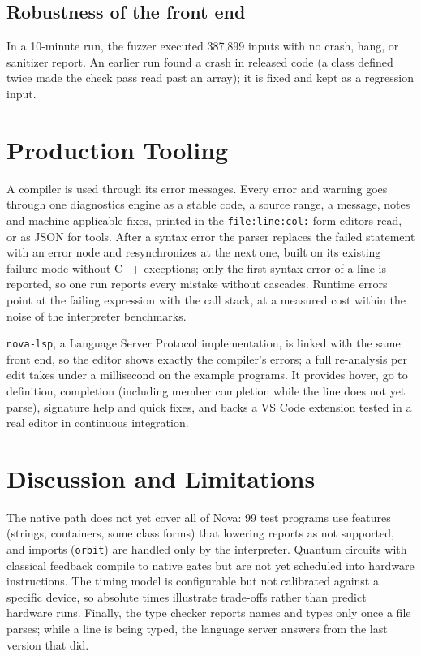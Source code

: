 \documentclass[11pt]{article}
\begin{document}
\subsection{Robustness of the front end}

In a 10-minute run, the fuzzer executed 387{,}899 inputs with no crash, hang, or sanitizer report. An earlier run
found a crash in released code (a class defined twice made the check pass read past an array); it is fixed and kept
as a regression input.

\section{Production Tooling}
\label{sec:tooling}

A compiler is used through its error messages. Every error and warning goes through one diagnostics engine as a
stable code, a source range, a message, notes and machine-applicable fixes, printed in the
\texttt{file:line:col:} form editors read, or as JSON for tools. After a syntax error the parser replaces the failed
statement with an error node and resynchronizes at the next one, built on its existing failure mode without C++
exceptions; only the first syntax error of a line is reported, so one run reports every mistake without cascades.
Runtime errors point at the failing expression with the call stack, at a measured cost within the noise of the
interpreter benchmarks.

\texttt{nova-lsp}, a Language Server Protocol implementation, is linked with the same front end, so the editor
shows exactly the compiler's errors; a full re-analysis per edit takes under a millisecond on the example programs.
It provides hover, go to definition, completion (including member completion while the line does not yet parse),
signature help and quick fixes, and backs a VS Code extension tested in a real editor in continuous integration.

\section{Discussion and Limitations}

The native path does not yet cover all of Nova: 99 test programs use features (strings, containers, some class
forms) that lowering reports as not supported, and imports (\texttt{orbit}) are handled only by the interpreter.
Quantum circuits with classical feedback compile to native gates but are not yet scheduled into hardware
instructions. The timing model is configurable but not calibrated against a specific device, so absolute times
illustrate trade-offs rather than predict hardware runs. Finally, the type checker reports names and types only
once a file parses; while a line is being typed, the language server answers from the last version that did.
\end{document}
